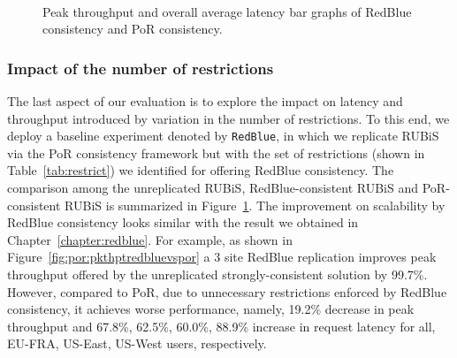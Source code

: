 \begin{figure}[t!]
\centering

\\
\caption{Peak throughput and overall average latency bar graphs of RedBlue consistency and PoR consistency.}
\label{fig:por:redbluevspor}
\end{figure}

\subsubsection{Impact of the number of restrictions}
The last aspect of our evaluation is to explore the impact on latency and throughput introduced by variation in the number
of restrictions. To this end, we deploy a baseline experiment denoted by {\tt RedBlue}, in which
we replicate RUBiS via the PoR consistency framework but with the set of restrictions (shown in Table~\ref{tab:restrict}) we identified for offering
RedBlue consistency. The comparison among the unreplicated RUBiS, RedBlue-consistent RUBiS
and PoR-consistent RUBiS is summarized in Figure~\ref{fig:por:redbluevspor}. The improvement on scalability by RedBlue
consistency looks similar with the result we obtained in Chapter~\ref{chapter:redblue}. For example, as shown in Figure~\ref{fig:por:pkthptredbluevspor}
a 3 site RedBlue replication
improves peak throughput offered by the unreplicated strongly-consistent solution by 99.7\%. However, compared to
PoR, due to unnecessary restrictions enforced by RedBlue consistency, it achieves worse performance, namely, 19.2\% decrease in peak throughput
and 67.8\%, 62.5\%, 60.0\%, 88.9\% increase in request latency for all, EU-FRA, US-East, US-West users, respectively.





